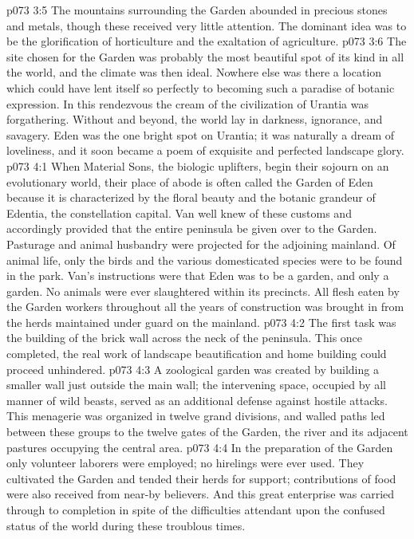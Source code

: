 \vs p073 3:5 The mountains surrounding the Garden abounded in precious stones and metals, though these received very little attention. The dominant idea was to be the glorification of horticulture and the exaltation of agriculture.
\vs p073 3:6 The site chosen for the Garden was probably the most beautiful spot of its kind in all the world, and the climate was then ideal. Nowhere else was there a location which could have lent itself so perfectly to becoming such a paradise of botanic expression. In this rendezvous the cream of the civilization of Urantia was forgathering. Without and beyond, the world lay in darkness, ignorance, and savagery. Eden was the one bright spot on Urantia; it was naturally a dream of loveliness, and it soon became a poem of exquisite and perfected landscape glory.
\vs p073 4:1 When Material Sons, the biologic uplifters, begin their sojourn on an evolutionary world, their place of abode is often called the Garden of Eden because it is characterized by the floral beauty and the botanic grandeur of Edentia, the constellation capital. Van well knew of these customs and accordingly provided that the entire peninsula be given over to the Garden. Pasturage and animal husbandry were projected for the adjoining mainland. Of animal life, only the birds and the various domesticated species were to be found in the park. Van’s instructions were that Eden was to be a garden, and only a garden. No animals were ever slaughtered within its precincts. All flesh eaten by the Garden workers throughout all the years of construction was brought in from the herds maintained under guard on the mainland.
\vs p073 4:2 The first task was the building of the brick wall across the neck of the peninsula. This once completed, the real work of landscape beautification and home building could proceed unhindered.
\vs p073 4:3 A zoological garden was created by building a smaller wall just outside the main wall; the intervening space, occupied by all manner of wild beasts, served as an additional defense against hostile attacks. This menagerie was organized in twelve grand divisions, and walled paths led between these groups to the twelve gates of the Garden, the river and its adjacent pastures occupying the central area.
\vs p073 4:4 In the preparation of the Garden only volunteer laborers were employed; no hirelings were ever used. They cultivated the Garden and tended their herds for support; contributions of food were also received from near\hyp{}by believers. And this great enterprise was carried through to completion in spite of the difficulties attendant upon the confused status of the world during these troublous times.
